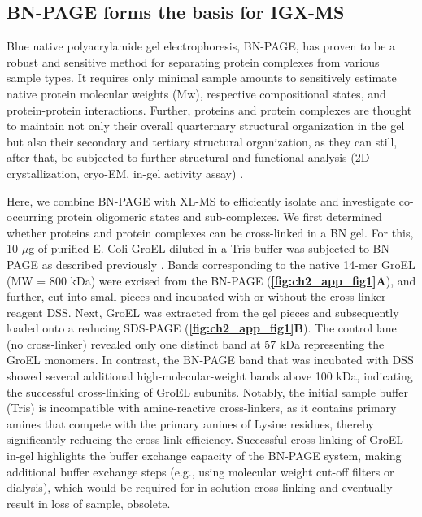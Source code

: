 \subsection*{BN-PAGE forms the basis for IGX-MS}
Blue native polyacrylamide gel electrophoresis, BN-PAGE, has proven to be a robust and sensitive method for separating protein complexes from various sample types. It requires only minimal sample amounts to sensitively estimate native protein molecular weights (Mw), respective compositional states, and protein-protein interactions. Further, proteins and protein complexes are thought to maintain not only their overall quarternary structural organization in the gel but also their secondary and tertiary structural organization, as they can still, after that, be subjected to further structural and functional analysis (2D crystallization, cryo-EM, in-gel activity assay) \cite{Poetsch_2000, Schafer_2006, Wittig_2007}.

Here, we combine BN-PAGE with XL-MS to efficiently isolate and investigate co-occurring protein oligomeric states and sub-complexes. We first determined whether proteins and protein complexes can be cross-linked in a BN gel. For this, 10 $\mu$g of purified E. Coli GroEL diluted in a Tris buffer was subjected to BN-PAGE as described previously \cite{Wittig_2006}. Bands corresponding to the native 14-mer GroEL (MW = 800 kDa) were excised from the BN-PAGE (\textbf{\autoref{fig:ch2_app_fig1}A}), and further, cut into small pieces and incubated with or without the cross-linker reagent DSS. Next, GroEL was extracted from the gel pieces and subsequently loaded onto a reducing SDS-PAGE (\textbf{\autoref{fig:ch2_app_fig1}B}). The control lane (no cross-linker) revealed only one distinct band at 57 kDa representing the GroEL monomers. In contrast, the BN-PAGE band that was incubated with DSS showed several additional high-molecular-weight bands above 100 kDa, indicating the successful cross-linking of GroEL subunits. Notably, the initial sample buffer (Tris) is incompatible with amine-reactive cross-linkers, as it contains primary amines that compete with the primary amines of Lysine residues, thereby significantly reducing the cross-link efficiency. Successful cross-linking of GroEL in-gel highlights the buffer exchange capacity of the BN-PAGE system, making additional buffer exchange steps (e.g., using molecular weight cut-off filters or dialysis), which would be required for in-solution cross-linking and eventually result in loss of sample, obsolete.
%
